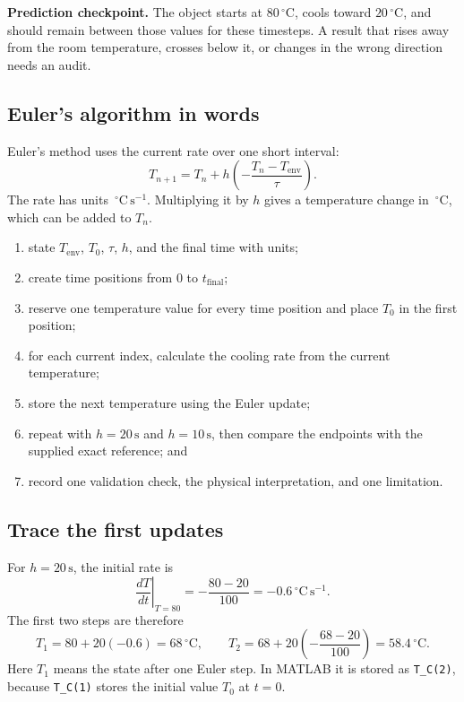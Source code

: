 \documentclass[11pt,a4paper]{article}
\newcommand{\units}[1]{\,\mathrm{#1}}
\begin{document}
\begin{samepage}
\begin{checkbox}\textbf{Prediction checkpoint.} The object starts at $80\units{^\circ C}$, cools toward $20\units{^\circ C}$, and should remain between those values for these timesteps. A result that rises away from the room temperature, crosses below it, or changes in the wrong direction needs an audit.\end{checkbox}

\subsection*{Euler's algorithm in words}
Euler's method uses the current rate over one short interval:
\[
T_{n+1}=T_n+h\left(-\frac{T_n-T_{\mathrm{env}}}{\tau}\right).
\]
The rate has units $\units{^\circ C\,s^{-1}}$. Multiplying it by $h$ gives a temperature change in $\units{^\circ C}$, which can be added to $T_n$.

\begin{enumerate}[nosep,leftmargin=7mm]
\item state $T_{\mathrm{env}}$, $T_0$, $\tau$, $h$, and the final time with units;
\item create time positions from $0$ to $t_{\mathrm{final}}$;
\item reserve one temperature value for every time position and place $T_0$ in the first position;
\item for each current index, calculate the cooling rate from the current temperature;
\item store the next temperature using the Euler update;
\item repeat with $h=20\units{s}$ and $h=10\units{s}$, then compare the endpoints with the supplied exact reference; and
\item record one validation check, the physical interpretation, and one limitation.
\end{enumerate}
\end{samepage}

\subsection*{Trace the first updates}
For $h=20\units{s}$, the initial rate is
\[
\left.\frac{dT}{dt}\right|_{T=80}=-\frac{80-20}{100}=-0.6\units{^\circ C\,s^{-1}}.
\]
The first two steps are therefore
\[
T_1=80+20(-0.6)=68\units{^\circ C},
\qquad
T_2=68+20\left(-\frac{68-20}{100}\right)=58.4\units{^\circ C}.
\]
Here $T_1$ means the state after one Euler step. In MATLAB it is stored as \texttt{T\_C(2)}, because \texttt{T\_C(1)} stores the initial value $T_0$ at $t=0$.
\end{document}
